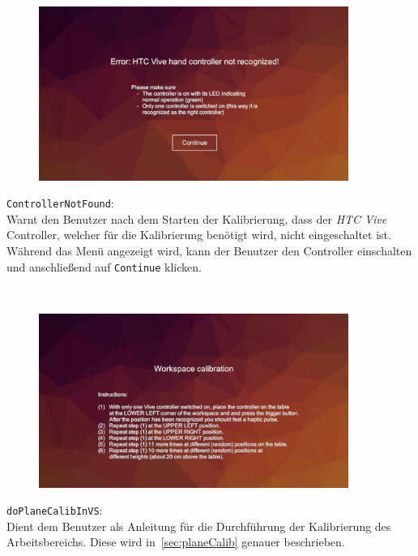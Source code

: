 \begin{minipage}{0.6\textwidth}
	\begin{figure}[H] 
		\includegraphics[trim=3cm 1cm 3cm 3cm, clip, width=0.9\textwidth]{Bilder/ControllerNotFound.jpg}
			\label{fig:ControllerNotFound}
	\end{figure}
\end{minipage}
\begin{minipage}{0.4\textwidth}
	\texttt{ControllerNotFound}:\\
	Warnt den Benutzer nach dem Starten der Kalibrierung, dass der \textit{HTC Vive} Controller, welcher für die Kalibrierung benötigt wird, nicht eingeschaltet ist. Während das Menü angezeigt wird, kann der Benutzer den Controller einschalten und anschließend auf \texttt{Continue} klicken.
\end{minipage}\\

\begin{minipage}{0.6\textwidth}
	\begin{figure}[H] 
		\includegraphics[trim=3cm 1cm 3cm 3cm, clip, width=0.9\textwidth]{Bilder/doPlaneCalibInVS.jpg}
			\label{fig:doPlaneCalibInVS}
	\end{figure}
\end{minipage}
\begin{minipage}{0.4\textwidth}
	\texttt{doPlaneCalibInVS}:\\
	Dient dem Benutzer als Anleitung für die Durchführung der Kalibrierung des Arbeitsbereichs. Diese wird in~\ref{sec:planeCalib} genauer beschrieben.
\end{minipage}\\

